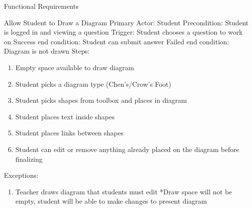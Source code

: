 \documentclass{article}
\begin{document}
\begin{section}{Functional Requirements}

    \begin{subsection}{Allow Student to Draw a Diagram}
    Primary Actor: Student \newline
    Precondition: Student is logged in and viewing a            question \newline
    Trigger: Student chooses a question to work on \newline
    Success end condition: Student can submit answer            \newline
    Failed end condition: Diagram is not drawn \newline
    \newline
    Steps:
    \begin{enumerate}
    \item{Empty space available to draw diagram}
    \item{Student picks a diagram type (Chen’s/Crow’s Foot)}
    \item{Student picks shapes from toolbox and places in           diagram}
    \item{Student places text inside shapes}
    \item{Student places links between shapes}
    \item{Student can edit or remove anything already placed on the diagram before finalizing}
    \end{enumerate}
    Exceptions:
    \begin{enumerate}
    \item{Teacher draws diagram that students must edit             \newline
        *Draw space will not be empty, student will be able to           make changes to present diagram}
    \end{enumerate}
    \end{subsection}
    

\end{section}
\end{document}
